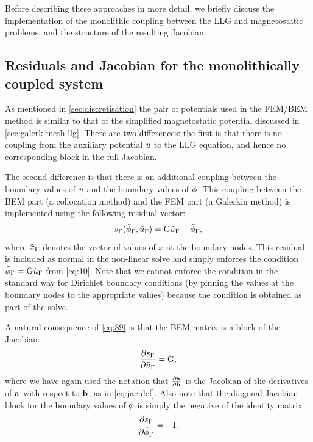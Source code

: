 Before describing these approaches in more detail, we briefly discuss the implementation of the monolithic coupling between the LLG and magnetostatic problems, and the structure of the resulting Jacobian.

\subsection{Residuals and Jacobian for the monolithically coupled system}
\label{sec:bem-jacobian-structure}

As mentioned in \cref{sec:discretisation} the pair of potentials used in the FEM/BEM method is similar to that of the simplified magnetostatic potential discussed in \cref{sec:galerk-meth-llg}.
There are two differences: the first is that there is no coupling from the auxiliary potential $u$ to the LLG equation, and hence no corresponding block in the full Jacobian.

The second difference is that there is an additional coupling between the boundary values of $u$ and the boundary values of $\phi$.
This coupling between the BEM part (a collocation method) and the FEM part (a Galerkin method) is implemented using the following residual vector:
\newcommand{\rphimb}{\rphi_\boundd}
\begin{equation}
  \rphimb(\phimdis_\boundd, \phionedis_\boundd) = \bm \phionedis_\boundd - \phimdis_\boundd,
  \label{eq:89}
\end{equation}
where $\tilde{x}_{\Gamma}$ denotes the vector of values of $x$ at the boundary nodes.
This residual is included as normal in the non-linear solve and simply enforces the condition $\tilde{\phi}_{\Gamma} = {\mathbf{\mathrm{G}}} \tilde{u}_{\Gamma}$ from \cref{eq:10}.
Note that we cannot enforce the condition in the standard way for Dirichlet boundary conditions (by pinning the values at the boundary nodes to the appropriate values) because the condition is obtained as part of the solve.

A natural consequence of \cref{eq:89} is that the BEM matrix is a block of the Jacobian:
\begin{equation}
  \pd{\rphimb}{\phionedis_\boundd} = \bm,
  \label{eq:92}
\end{equation}
where we have again used the notation that $\frac{\partial {\boldsymbol{\mathrm{a}}}}{\partial {\boldsymbol{\mathrm{b}}}}$ is the Jacobian of the derivatives of ${\boldsymbol{\mathrm{a}}}$ with respect to ${\boldsymbol{\mathrm{b}}}$, as in \cref{eq:jac-def}.
Also note that the diagonal Jacobian block for the boundary values of $\phi$ is simply the negative of the identity matrix
\begin{equation}
  \pd{\rphimb}{\phimdis_\boundd} = -\Idm.
  \label{eq:91}
\end{equation}

